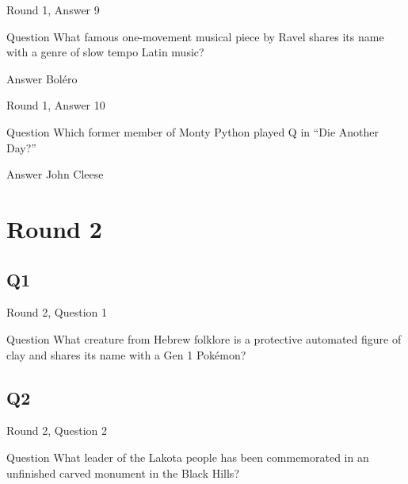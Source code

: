 \documentclass[11pt]{beamer}
\begin{document}
\begin{frame}[t]{Round 1, Answer 9}
\vspace{2em}
\begin{block}{Question}
What famous one-movement musical piece by Ravel shares its name with a genre of slow tempo Latin music\@?
\end{block}
\pause{}
\begin{block}{Answer}
Boléro
\end{block}
\end{frame}
    

\begin{frame}[t]{Round 1, Answer 10}
\vspace{2em}
\begin{block}{Question}
Which former member of Monty Python played Q in ``Die Another Day?''
\end{block}
\pause{}
\begin{block}{Answer}
John Cleese
\end{block}
\end{frame}
    

\section{Round 2}
    

\subsection*{Q1}
\begin{frame}[t]{Round 2, Question 1}
\vspace{2em}
\begin{block}{Question}
What creature from Hebrew folklore is a protective automated figure of clay and shares its name with a Gen 1 Pokémon\@?
\end{block}
\end{frame}
    

\subsection*{Q2}
\begin{frame}[t]{Round 2, Question 2}
\vspace{2em}
\begin{block}{Question}
What leader of the Lakota people has been commemorated in an unfinished carved monument in the Black Hills\@?
\end{block}
\end{frame}
    
\end{document}
